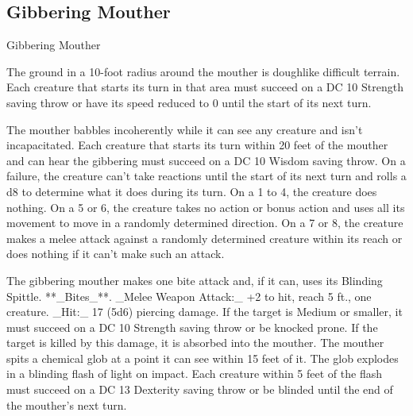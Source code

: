 \subsection{Gibbering Mouther}
\begin{DndMonster}[float=*b,width\textwidth + 8pt]{Gibbering Mouther}
\begin{multicols}{2}
\DndMonsterBasics[armor-class={9}, hit-points={67 (9d8 + 27)}, speed={10 ft., swim 10 ft.}]
\DndMonsterDetails[saving-throws={}, skills={}, damage-immunities={}, damage-resistances={}, damage-vulnerabilities={}, condition-immunities={prone}, senses={darkvision 60 ft., passive Perception 10}, languages={—}, challenge={2 (450 XP)}]
 The ground in a 10-foot radius around the mouther is doughlike difficult terrain. Each creature that starts its turn in that area must succeed on a DC 10 Strength saving throw or have its speed reduced to 0 until the start of its next turn.

 The mouther babbles incoherently while it can see any creature and isn’t incapacitated. Each creature that starts its turn within 20 feet of the mouther and can hear the gibbering must succeed on a DC 10 Wisdom saving throw. On a failure, the creature can’t take reactions until the start of its next turn and rolls a d8 to determine what it does during its turn. On a 1 to 4, the creature does nothing. On a 5 or 6, the creature takes no action or bonus action and uses all its movement to move in a randomly determined direction. On a 7 or 8, the creature makes a melee attack against a randomly determined creature within its reach or does nothing if it can’t make such an attack.

 The gibbering mouther makes one bite attack and, if it can, uses its Blinding Spittle.
**_Bites_**. _Melee Weapon Attack:_ +2 to hit, reach 5 ft., one creature. _Hit:_ 17 (5d6) piercing damage. If the target is Medium or smaller, it must succeed on a DC 10 Strength saving throw or be knocked prone. If the target is killed by this damage, it is absorbed into the mouther.
The mouther spits a chemical glob at a point it can see within 15 feet of it. The glob explodes in a blinding flash of light on impact. Each creature within 5 feet of the flash must succeed on a DC 13 Dexterity saving throw or be blinded until the end of the mouther’s next turn.
\end{multicols}
\end{DndMonster}
